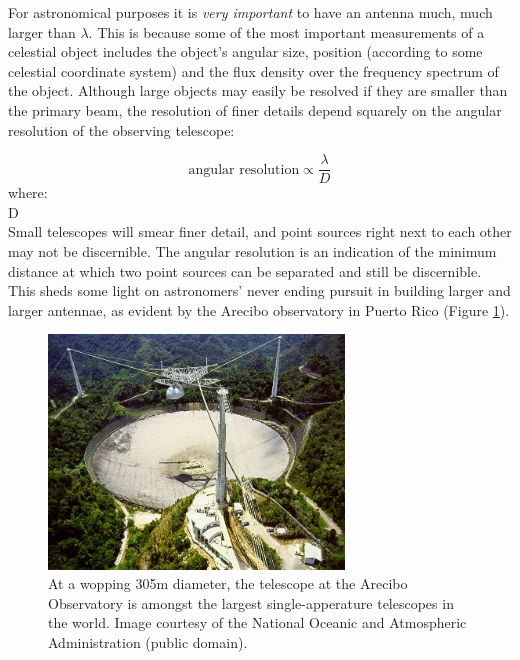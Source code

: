 For astronomical purposes it is \textit{very important} to have an antenna much, much larger than $\lambda$. This is because some 
of the most important measurements of a celestial object includes the object's angular size, position (according to some celestial 
coordinate system) and the flux density over the frequency spectrum of the object. Although large objects may easily be resolved if
they are smaller than the primary beam, the resolution of finer details depend squarely on the angular resolution of the observing 
telescope:

\begin{equation*}
 \text{angular resolution} \propto \frac{\lambda}{D}
\end{equation*}
where:\\
  D \\

Small telescopes will smear finer detail, and point sources right next to each other may not be discernible. The angular resolution is
an indication of the minimum distance at which two point sources can be separated and still be discernible. This sheds some light on astronomers'
never ending pursuit in building larger and larger antennae, as evident by the Arecibo observatory in Puerto Rico (Figure \ref{fig_arecibo}).

\begin{figure}[ht]
 \begin{mdframed}
 \centering
 \includegraphics[width=0.7\textwidth]{images/arecibo.jpg}
 \caption[Arecibo Observatory]{At a wopping 305m diameter, the telescope at the Arecibo Observatory is amongst the largest single-apperature telescopes in the world. 
 Image courtesy of the National Oceanic and Atmospheric Administration (public domain).}
  \label{fig_arecibo}
 \end{mdframed}
\end{figure}

